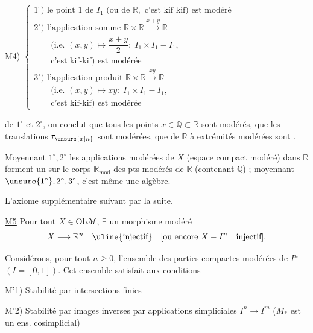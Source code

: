 M4) $\left\{\begin{array}{l}
1^\circ)\text{ le point }1\text{ de }I_1\text{ (ou de }\mathbb R,\text{ c'est kif kif) est modéré}\\
2^\circ)\text{ l'application somme }\mathbb R\times\mathbb R\xrightarrow{x+y}\mathbb R\\
\qquad(\text{i.e. }(x,y)\longmapsto\dfrac{x+y}{2}:\;I_1\times I_1-I_1,\\
\qquad\text{c'est kif-kif) est modérée}\\
3^\circ)\text{ l'application produit }\mathbb R\times\mathbb R\xrightarrow{xy}\mathbb R\\
\qquad(\text{i.e. }(x,y)\longmapsto xy:\;I_1\times I_1-I_1,\\
\qquad\text{c'est kif-kif) est modérée}
\end{array}\right.$

de $1^\circ$ et $2^\circ$, on conclut que tous les points $x\in\mathbb Q\subset\mathbb R$ sont modérés, que les translations  $\tau_{\unsure{x|n}}$  sont modérées, que  de $\mathbb R$ à extrémités modérées sont .


Moyennant $1^\circ,2^\circ$ les applications modérées de $X$ (espace compact modéré) dans $\mathbb R$ forment un  sur le corps $\mathbb R_{\mathrm{mod}}$ des pts modérés de $\mathbb R$ (contenant $\mathbb Q$) ; moyennant $\unsure{1^\circ},2^\circ,3^\circ$, c'est même une \uline{algèbre}.

L'axiome supplémentaire suivant  par la suite.

\uline{M5} Pour tout $X\in\mathrm{Ob}\mathcal M$, $\exists$  un morphisme modéré
\[
X\longrightarrow\mathbb R^n\quad\uline{\text{injectif}}
\quad[\text{ou encore }X-I^n\quad\text{injectif}].
\]

Considérons, pour tout $n\geq0$, l'ensemble  des parties compactes modérées de $I^n$ $(I=[0,1])$. Cet ensemble  satisfait aux conditions


M'1) Stabilité par intersections finies

M'2) Stabilité par images inverses par applications  simpliciales $I^n\longrightarrow I^m$ ($M_*$ est un ens. cosimplicial)

